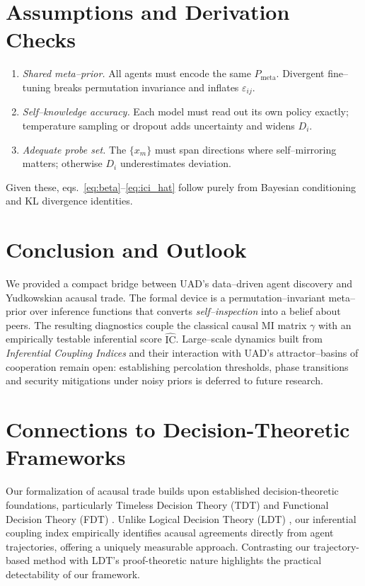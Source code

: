 \documentclass[11pt]{article}
\begin{document}
\section{Assumptions and Derivation Checks}
\begin{enumerate}
  \item \emph{Shared meta--prior.}  All agents must encode the same
    $P_{\text{meta}}$.  Divergent fine--tuning breaks permutation invariance and
    inflates $\varepsilon_{ij}$.
  \item \emph{Self--knowledge accuracy.}  Each model must read out its own
    policy exactly; temperature sampling or dropout adds uncertainty and widens
    $D_i$.
  \item \emph{Adequate probe set.}  The $\{x_m\}$ must span directions where
    self--mirroring matters; otherwise $D_i$ underestimates deviation.
\end{enumerate}

Given these, eqs.~\eqref{eq:beta}--\eqref{eq:ici_hat} follow purely from
Bayesian conditioning and KL divergence identities.

\section{Conclusion and Outlook}
We provided a compact bridge between UAD’s data--driven agent discovery and
Yudkowskian acausal trade.  The formal device is a permutation--invariant
meta--prior over inference functions that converts \emph{self--inspection} into
a belief about peers.  The resulting diagnostics couple the classical causal MI
matrix $\gamma$ with an empirically testable inferential score
$\widehat{\mathrm{IC}}$.  Large--scale dynamics built from
\emph{Inferential Coupling Indices} and their interaction with UAD’s
attractor–basins of cooperation\cite{attractor2025} remain open: establishing
percolation thresholds, phase transitions and security mitigations under noisy
priors is deferred to future research.

\section{Connections to Decision-Theoretic Frameworks}
Our formalization of acausal trade builds upon established decision-theoretic foundations, particularly Timeless Decision Theory (TDT) and Functional Decision Theory (FDT) \cite{yudkowsky2017functional}. Unlike Logical Decision Theory (LDT) \cite{critch2020ai, garrabrant2017logical}, our inferential coupling index empirically identifies acausal agreements directly from agent trajectories, offering a uniquely measurable approach. Contrasting our trajectory-based method with LDT's proof-theoretic nature highlights the practical detectability of our framework.



\end{document}

